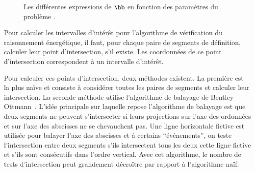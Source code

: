 \begin{figure}[!htb]
{
  }
  \caption{Les différentes expressions de $\bb$ en fonction des
    paramètres du problème \CECSP.}
  \label{fig:breakline_res}
\end{figure}

Pour calculer les intervalles d'intérêt pour l'algorithme de
vérification du raisonnement énergétique, il faut, pour chaque paire
de segments de définition, calculer leur point d'intersection, s'il
existe. Les coordonnées de ce point d'intersection correspondent à un
intervalle d'intérêt. 

Pour calculer ces points d'intersection, deux méthodes existent. La
première est la plus naïve et consiste à considérer toutes les paires
de segments et calculer leur intersection. La seconde méthode utilise
l'algorithme de balayage de Bentley-Ottmann~\cite{sweep}.  L'idée
principale sur laquelle repose l'algorithme de balayage est que deux
segments ne peuvent s'intersecter si leurs projections sur l'axe
des ordonnées et sur l'axe des abscisses ne se chevauchent pas. Une
ligne horizontale fictive est utilisée pour balayer l'axe des
abscisses et à certains ``événements'', on teste l'intersection entre
deux segments s'ils intersectent tous les deux cette ligne fictive et
s'ils sont consécutifs dans l'ordre vertical. Avec cet algorithme, le
nombre de tests d'intersection peut grandement décroître par rapport à
l'algorithme naïf.

